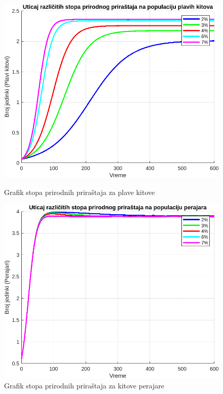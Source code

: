 \documentclass[a4paper]{article}
\begin{document}
{	\begin{figure}[h]
		\centering
		\begin{minipage}[h]{0.45\linewidth}
			\centering
			\includegraphics[width=\textwidth]{plaviQ.png}
			\caption{Grafik stopa prirodnih priraštaja za plave kitove}
			\label{slika1: uticaj6}
		\end{minipage}
		\hspace{0.5cm} 
		\begin{minipage}[h]{0.45\linewidth}
			\centering
			\includegraphics[width=\textwidth]{perajariQ.png} 
			\caption{Grafik stopa prirodnih priraštaja za kitove perajare} 
			\label{slika2: uticaj7}
		\end{minipage}
	\end{figure}
	
}
\end{document}
